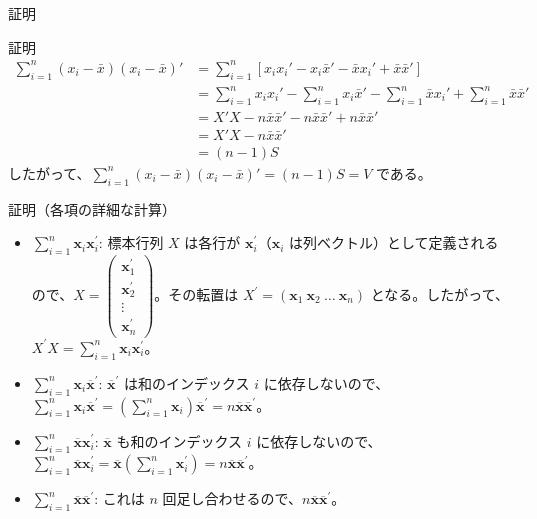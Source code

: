 \documentclass[aspectratio=169]{beamer}
\begin{document}
\begin{frame}{証明}
\begin{block}{証明}
\[
\begin{aligned}
\sum_{i=1}^n (x_i - \bar{x})(x_i - \bar{x})'
&= \sum_{i=1}^n \left[ x_i x_i' - x_i \bar{x}' - \bar{x} x_i' + \bar{x} \bar{x}' \right] \\
&= \sum_{i=1}^n x_i x_i' - \sum_{i=1}^n x_i \bar{x}' - \sum_{i=1}^n \bar{x} x_i' + \sum_{i=1}^n \bar{x} \bar{x}' \\
&= X'X - n\bar{x} \bar{x}' - n\bar{x} \bar{x}' + n\bar{x} \bar{x}' \\
&= X'X - n\bar{x} \bar{x}' \\
&= (n-1)S
\end{aligned}
\]
したがって、$\sum_{i=1}^n (x_i - \bar{x})(x_i - \bar{x})' = (n-1)S = V$ である。
\end{block}
\end{frame}

\begin{frame}{証明（各項の詳細な計算）}
\begin{itemize}
    \item $\sum_{i=1}^{n}\bm{x}_{i}\bm{x}_{i}^{\prime}$: 標本行列 $X$ は各行が $\bm{x}_{i}^{\prime}$（$\bm{x}_{i}$ は列ベクトル）として定義されるので、$X=\begin{pmatrix}\bm{x}_{1}^{\prime}\\ \bm{x}_{2}^{\prime}\\ \vdots\\ \bm{x}_{n}^{\prime}\end{pmatrix}$。その転置は $X^{\prime}=(\bm{x}_{1}\ \bm{x}_{2}\ \dots\ \bm{x}_{n})$ となる。したがって、$X^{\prime}X=\sum_{i=1}^{n}\bm{x}_{i}\bm{x}_{i}^{\prime}$。
    \item $\sum_{i=1}^{n}\bm{x}_{i}\overline{\bm{x}}^{\prime}$: $\overline{\bm{x}}^{\prime}$ は和のインデックス $i$ に依存しないので、$\sum_{i=1}^{n}\bm{x}_{i}\overline{\bm{x}}^{\prime} = (\sum_{i=1}^{n}\bm{x}_{i})\overline{\bm{x}}^{\prime} = n\overline{\bm{x}}\overline{\bm{x}}^{\prime}$。
    \item $\sum_{i=1}^{n}\overline{\bm{x}}\bm{x}_{i}^{\prime}$: $\overline{\bm{x}}$ も和のインデックス $i$ に依存しないので、$\sum_{i=1}^{n}\overline{\bm{x}}\bm{x}_{i}^{\prime} = \overline{\bm{x}}(\sum_{i=1}^{n}\bm{x}_{i}^{\prime}) = n\overline{\bm{x}}\overline{\bm{x}}^{\prime}$。
    \item $\sum_{i=1}^{n}\overline{\bm{x}}\overline{\bm{x}}^{\prime}$: これは $n$ 回足し合わせるので、$n\overline{\bm{x}}\overline{\bm{x}}^{\prime}$。
\end{itemize}
\end{frame}
\end{document}

